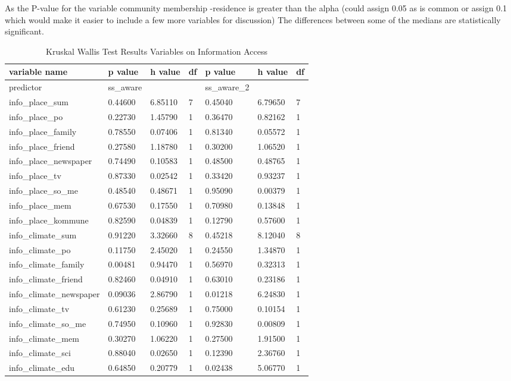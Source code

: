 As the P-value for the variable community membership -residence is greater than the alpha (could assign 0.05 as is common or assign 0.1 which would make it easier to include a few more variables for discussion) The differences between some of the medians are statistically significant.

\begin{table}[!ht]
    \centering
    \begin{tabular}{|l|l|l|l|l|l|l|}
    \hline
        variable name & p value & h value & df & p value & h value & df \\ \hline
        predictor & ss\_aware & ~ & ~ & ss\_aware\_2 & ~ & ~ \\ \hline
        info\_place\_sum & 0.44600 & 6.85110 & 7 & 0.45040 & 6.79650 & 7 \\ \hline
        info\_place\_po & 0.22730 & 1.45790 & 1 & 0.36470 & 0.82162 & 1 \\ \hline
        info\_place\_family & 0.78550 & 0.07406 & 1 & 0.81340 & 0.05572 & 1 \\ \hline
        info\_place\_friend & 0.27580 & 1.18780 & 1 & 0.30200 & 1.06520 & 1 \\ \hline
        info\_place\_newspaper & 0.74490 & 0.10583 & 1 & 0.48500 & 0.48765 & 1 \\ \hline
        info\_place\_tv & 0.87330 & 0.02542 & 1 & 0.33420 & 0.93237 & 1 \\ \hline
        info\_place\_so\_me & 0.48540 & 0.48671 & 1 & 0.95090 & 0.00379 & 1 \\ \hline
        info\_place\_mem & 0.67530 & 0.17550 & 1 & 0.70980 & 0.13848 & 1 \\ \hline
        info\_place\_kommune & 0.82590 & 0.04839 & 1 & 0.12790 & 0.57600 & 1 \\ \hline
        info\_climate\_sum & 0.91220 & 3.32660 & 8 & 0.45218 & 8.12040 & 8 \\ \hline
        info\_climate\_po & 0.11750 & 2.45020 & 1 & 0.24550 & 1.34870 & 1 \\ \hline
        info\_climate\_family & 0.00481 & 0.94470 & 1 & 0.56970 & 0.32313 & 1 \\ \hline
        info\_climate\_friend & 0.82460 & 0.04910 & 1 & 0.63010 & 0.23186 & 1 \\ \hline
        info\_climate\_newspaper & 0.09036 & 2.86790 & 1 & 0.01218 & 6.24830 & 1 \\ \hline
        info\_climate\_tv & 0.61230 & 0.25689 & 1 & 0.75000 & 0.10154 & 1 \\ \hline
        info\_climate\_so\_me & 0.74950 & 0.10960 & 1 & 0.92830 & 0.00809 & 1 \\ \hline
        info\_climate\_mem & 0.30270 & 1.06220 & 1 & 0.27500 & 1.91500 & 1 \\ \hline
        info\_climate\_sci & 0.88040 & 0.02650 & 1 & 0.12390 & 2.36760 & 1 \\ \hline
        info\_climate\_edu & 0.64850 & 0.20779 & 1 & 0.02438 & 5.06770 & 1 \\ \hline
    \end{tabular}
    \caption{Kruskal Wallis Test Results Variables on Information Access}
    \label{Kruskal_wallis_test_information}
\end{table}


